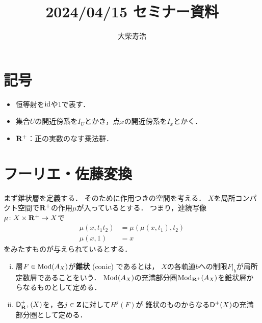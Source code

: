 





\title{2024/04/15 セミナー資料}
\author{大柴寿浩}
\date{}

\maketitle

\section*{記号}
\begin{itemize}
    \item 恒等射を\(\mathop{\mathrm{id}}\nolimits\)や\(1\)で表す．
    \item 集合\(U\)の開近傍系を\(I_U\)とかき，点\(x\)の開近傍系を\(I_x\)とかく．
    \item \(\mathbf{R}^+\)：正の実数のなす乗法群．
\end{itemize}

\section{フーリエ・佐藤変換{\cite[section 3.7]{KS90}}}

まず錐状層を定義する．
そのために作用つきの空間を考える．
\(X\)を局所コンパクト空間で\(\mathbf{R}^+\)の作用\(\mu\)が入っているとする．
つまり，連続写像\(\mu\colon X\times \mathbf{R}^+\to X\)で
\begin{align*}
    \mu(x,t_1t_2)&=\mu(\mu(x,t_1),t_2)\\
    \mu(x,1)&=x
\end{align*}
をみたすものが与えられているとする．
\begin{leftbar}
\begin{DFN}[{\cite[Definition 3.7.1]{KS90}}]
    \begin{enumerate}[(i)]
        \item 層\(F\in\mathop{\mathrm{Mod}}\nolimits(A_X)\)が\textbf{錐状} (conic) であるとは，
        \(X\)の各軌道\(b\)への制限\(F\rvert_b\)が局所定数層であることをいう．
        \(\mathop{\mathrm{Mod}}\nolimits(A_X)\)の充満部分圏\(\mathop{\mathrm{Mod}}\nolimits_{\mathbf{R}^+}(A_X)\)を錐状層からなるものとして定める．
        \item \(\mathsf{D}^{+}_{\mathbf{R}^+}(X)\)を，各\(j\in\mathbf{Z}\)に対して\(H^j(F)\)が
        錐状のものからなる\(\mathop{\mathsf{D}^\mathrm{+}}\nolimits(X)\)の充満部分圏として定める．
    \end{enumerate}
\end{DFN}
\end{leftbar}

